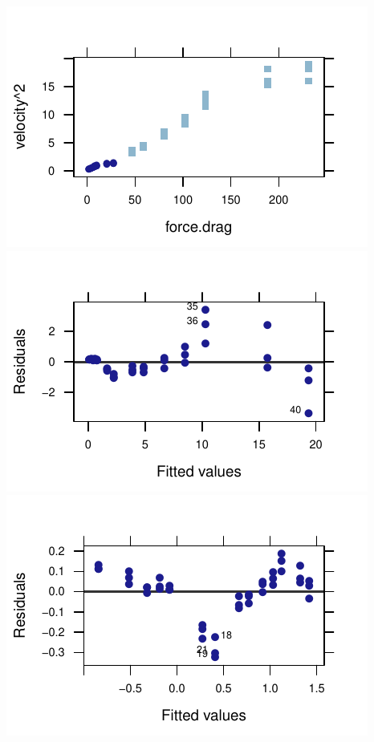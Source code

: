 \documentclass[twoside]{book}\usepackage[]{graphicx}\usepackage[]{xcolor}
\makeatletter
\def\maxwidth{ %
  \ifdim\Gin@nat@width>\linewidth
    \linewidth
  \else
    \Gin@nat@width
  \fi
}
\newenvironment{knitrout}{}{} %
\makeatother
\begin{document}
\begin{solution}
\begin{knitrout}
{\centering \includegraphics[width=\maxwidth]{figures/fig-drag-plots-1} 
\includegraphics[width=\maxwidth]{figures/fig-drag-plots-2} 
\includegraphics[width=\maxwidth]{figures/fig-drag-plots-3} 

}



\end{knitrout}
\end{solution}
\end{document}
